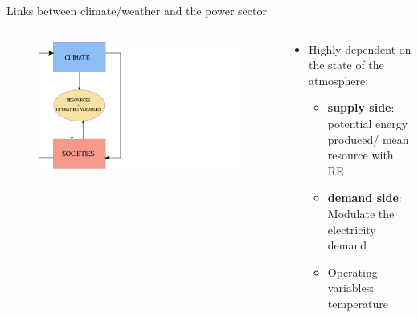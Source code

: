 \documentclass{beamer}%
\begin{document}
\begin{frame}[fragile]{Links between climate/weather and the power sector}
  \begin{columns}
    \begin{column}{0.3\textwidth}
  \begin{figure}
    \centering\includegraphics[scale=0.55]{drawing1.pdf}
\end{figure}
  \end{column}
  \begin{column}{0.7\textwidth}
    \begin{itemize}
    \item Highly dependent on the state of the atmosphere:
      \begin{itemize}
      \item <2->\textbf{\alert{supply side}}: potential energy produced/ mean resource with RE
      \item <3->\textbf{\alert{demand side}}: Modulate the electricity demand
      \item <4->Operating variables: temperature   
      \end{itemize}
      \end{itemize}
    \end{column}
    \end{columns}
\end{frame}
\end{document}
